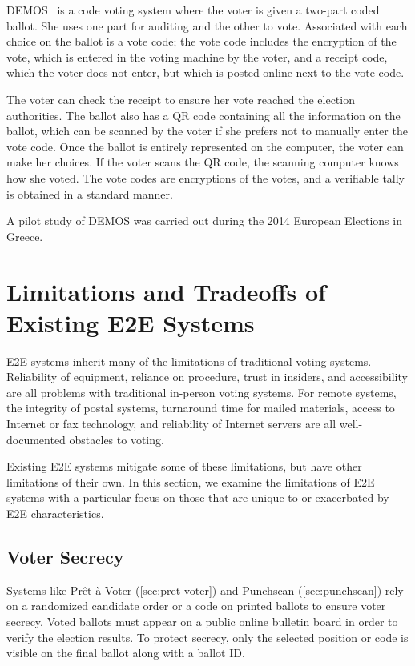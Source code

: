 DEMOS~\cite{kiayias2014} is a code voting system where the voter is
given a two-part coded ballot. She uses one part for auditing and the
other to vote. Associated with each choice on the ballot is a vote
code; the vote code includes the encryption of the vote, which is
entered in the voting machine by the voter, and a receipt code, which
the voter does not enter, but which is posted online next to the vote
code.

The voter can check the receipt to ensure her vote reached the
election authorities. The ballot also has a QR code containing all the
information on the ballot, which can be scanned by the voter if she
prefers not to manually enter the vote code. Once the ballot is
entirely represented on the computer, the voter can make her
choices. If the voter scans the QR code, the scanning computer knows
how she voted. The vote codes are encryptions of the votes, and a
verifiable tally is obtained in a standard manner.

A pilot study of DEMOS was carried out during the 2014 European
Elections in Greece.

\section{Limitations and Tradeoffs of Existing E2E Systems}
\label{sec:limit-exist-syst}

E2E systems inherit many of the limitations of traditional voting
systems. Reliability of equipment, reliance on procedure, trust in
insiders, and accessibility are all problems with traditional
in-person voting systems. For remote systems, the integrity of postal
systems, turnaround time for mailed materials, access to Internet or
fax technology, and reliability of Internet servers are all
well-documented obstacles to voting. 

Existing E2E systems mitigate some of these limitations, but have
other limitations of their own. In this section, we examine the
limitations of E2E systems with a particular focus on those that are
unique to or exacerbated by E2E characteristics.

\subsection{Voter Secrecy}

Systems like Prêt à Voter (\autoref{sec:pret-voter}) and Punchscan
(\autoref{sec:punchscan}) rely on a randomized candidate order or a
code on printed ballots to ensure voter secrecy. Voted ballots must
appear on a public online bulletin board in order to verify the
election results. To protect secrecy, only the selected position or
code is visible on the final ballot along with a ballot ID.

